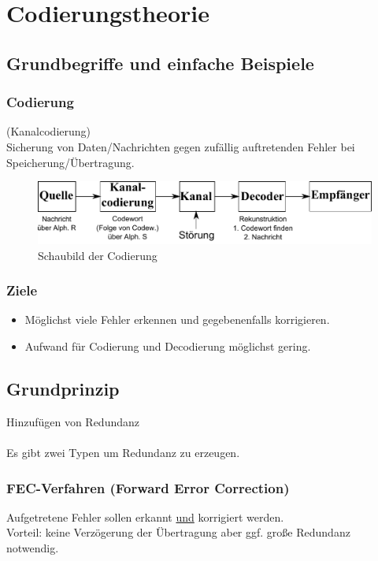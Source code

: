 \chapter{Codierungstheorie}

\section{Grundbegriffe und einfache Beispiele}

\subsection{Codierung} (Kanalcodierung)\\
Sicherung von Daten/Nachrichten gegen zuf\"allig auftretenden Fehler bei Speicherung/\"Ubertragung.\\
\begin{figure}[h]
	\centering
	\includegraphics[totalheight=0.1\textheight]{./img/codierung_schaubild.pdf}
	\caption{Schaubild der Codierung}
	\label{img:Schaubild Codierung}
\end{figure}

\subsection{Ziele}
\begin{itemize}
	\item M\"oglichst viele Fehler erkennen und gegebenenfalls korrigieren. %
	\item Aufwand f\"ur Codierung und Decodierung m\"oglichst gering.
\end{itemize}

\section{Grundprinzip} Hinzuf\"ugen von Redundanz\\
\\
Es gibt zwei Typen um Redundanz zu erzeugen.
\subsection{FEC-Verfahren (Forward Error Correction)}
Aufgetretene Fehler sollen erkannt \underline{und} korrigiert werden.\\
Vorteil: keine Verz\"ogerung der \"Ubertragung aber ggf. gro\ss e Redundanz notwendig.

